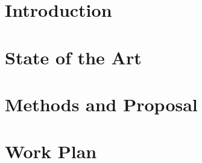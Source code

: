 \documentclass[11pt,a4paper,twoside]{memoir}
\begin{document}
\MakeCover

\frontmatter
\pagestyle{plain}
\small
\SingleSpacing
\tableofcontents
\clearpage

\mainmatter
\normalsize
\OnehalfSpacing
{}

\chapter{Introduction}
\label{ch:intro}


\chapter{State of the Art}
\label{ch:sota}


\chapter{Methods and Proposal}
\label{ch:methods}


\chapter{Work Plan}
\label{ch:plan}


\SingleSpacing
\printbibliography[heading=bibintoc]
\end{document}
